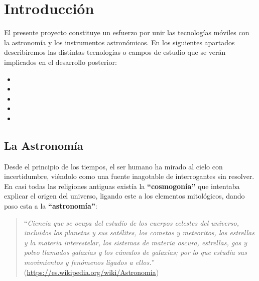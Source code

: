 \chapter{Introducción}

El presente proyecto constituye un esfuerzo por unir las tecnologías móviles con la astronomía y los instrumentos astronómicos. En los siguientes apartados describiremos las distintas tecnologías o campos de estudio que se verán implicados en el desarrollo posterior:

\begin{itemize}
  \item {}
  \item {}
  \item {}
  \item {}
  \item {}
\end{itemize}

\section{La Astronomía}

Desde el principio de los tiempos, el ser humano ha mirado al cielo con incertidumbre, viéndolo como una fuente inagotable de interrogantes sin resolver. En casi todas las religiones antiguas existía la \textbf{``cosmogonía''} que intentaba explicar el origen del universo, ligando este a los elementos mitológicos, dando paso esta a la \textbf{``astronomía''}:

\begin{quote}``\textit{Ciencia que se ocupa del estudio de los cuerpos celestes del universo, incluidos los planetas y sus satélites, los cometas y meteoritos, las estrellas y la materia interestelar, los sistemas de materia oscura, estrellas, gas y polvo llamados galaxias y los cúmulos de galaxias; por lo que estudia sus movimientos y fenómenos ligados a ellos.}''
\newline(\href{https://es.wikipedia.org/wiki/Astronom%C3%ADa}{https://es.wikipedia.org/wiki/Astronomia})
\end{quote}

